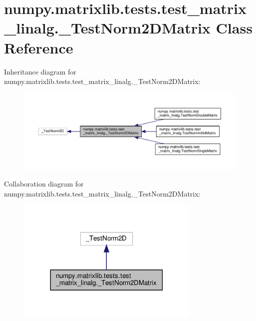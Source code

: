 \hypertarget{classnumpy_1_1matrixlib_1_1tests_1_1test__matrix__linalg_1_1__TestNorm2DMatrix}{}\section{numpy.\+matrixlib.\+tests.\+test\+\_\+matrix\+\_\+linalg.\+\_\+\+Test\+Norm2\+D\+Matrix Class Reference}
\label{classnumpy_1_1matrixlib_1_1tests_1_1test__matrix__linalg_1_1__TestNorm2DMatrix}


Inheritance diagram for numpy.\+matrixlib.\+tests.\+test\+\_\+matrix\+\_\+linalg.\+\_\+\+Test\+Norm2\+D\+Matrix\+:
\nopagebreak
\begin{figure}[H]
\begin{center}
\leavevmode
\includegraphics[width=350pt]{classnumpy_1_1matrixlib_1_1tests_1_1test__matrix__linalg_1_1__TestNorm2DMatrix__inherit__graph}
\end{center}
\end{figure}


Collaboration diagram for numpy.\+matrixlib.\+tests.\+test\+\_\+matrix\+\_\+linalg.\+\_\+\+Test\+Norm2\+D\+Matrix\+:
\nopagebreak
\begin{figure}[H]
\begin{center}
\leavevmode
\includegraphics[width=248pt]{classnumpy_1_1matrixlib_1_1tests_1_1test__matrix__linalg_1_1__TestNorm2DMatrix__coll__graph}
\end{center}
\end{figure}
